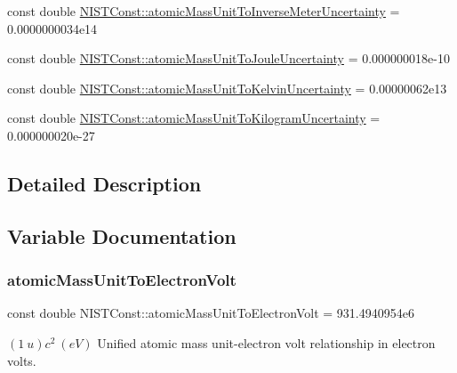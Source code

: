 \begin{DoxyCompactItemize}
\item 
const double \hyperlink{group___atomic_mass_unit_gae2ac6f33619c73c37ef774ca7088844a}{N\+I\+S\+T\+Const\+::atomic\+Mass\+Unit\+To\+Inverse\+Meter\+Uncertainty} = 0.\+0000000034e14
\item 
const double \hyperlink{group___atomic_mass_unit_ga0d86dc8fac39e6589510009376d261d6}{N\+I\+S\+T\+Const\+::atomic\+Mass\+Unit\+To\+Joule\+Uncertainty} = 0.\+000000018e-\/10
\item 
const double \hyperlink{group___atomic_mass_unit_ga124459785d7b4bcbc5a97ed591d859ae}{N\+I\+S\+T\+Const\+::atomic\+Mass\+Unit\+To\+Kelvin\+Uncertainty} = 0.\+00000062e13
\item 
const double \hyperlink{group___atomic_mass_unit_ga8726643b734abfa2cc6c41b98f59f8c2}{N\+I\+S\+T\+Const\+::atomic\+Mass\+Unit\+To\+Kilogram\+Uncertainty} = 0.\+000000020e-\/27
\end{DoxyCompactItemize}


\subsection{Detailed Description}


\subsection{Variable Documentation}
\mbox{\label{group___atomic_mass_unit_ga4a5d912289e6a828a25e9e7ae3385b0d}} 
\subsubsection{\texorpdfstring{atomic\+Mass\+Unit\+To\+Electron\+Volt}{atomicMassUnitToElectronVolt}}
{\footnotesize\ttfamily const double N\+I\+S\+T\+Const\+::atomic\+Mass\+Unit\+To\+Electron\+Volt = 931.\+4940954e6}

$(1\ u)c^2 \ (eV)$ Unified atomic mass unit-\/electron volt relationship in electron volts. \mbox{\label{group___atomic_mass_unit_ga5b9ec7f36c14dabc54a16d1e076bee14}} 
